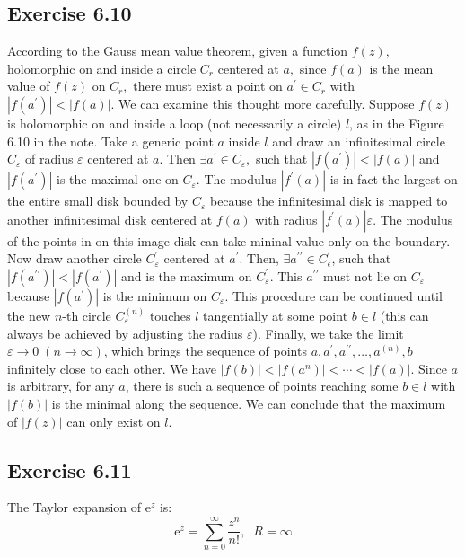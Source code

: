 \documentclass[]{ctexart}
\begin{document}
	\subsection{Exercise 6.10}
	According to the Gauss mean value theorem, given a function $f(z),$ holomorphic on and inside a circle $C_{r}$ centered at $a,$ since $f(a)$ is the mean value of $f(z)$ on $C_{r},$ there must exist a point on $a^{\prime} \in C_{r}$ with $\left|f\left(a^{\prime}\right)\right|<|f(a)| .$ We can examine this thought more carefully. Suppose $f(z)$ is holomorphic on and inside a loop (not necessarily a circle) $l$, as in the Figure 6.10 in the note. Take a generic point $a$ inside $l$ and draw an infinitesimal circle $C_{\varepsilon}$ of radius $\varepsilon$ centered at $a$. Then $\exists a^{\prime} \in C_{\varepsilon},$ such that $\left|f\left(a^{\prime}\right)\right|<|f(a)|$ and $\left|f\left(a^{\prime}\right)\right|$ is the maximal one on $C_{\varepsilon}$. The modulus $\left|f^{\prime}(a)\right|$ is in fact the largest on the entire small disk bounded by $C_{\varepsilon}$ because the infinitesimal disk is mapped to another infinitesimal disk centered at $f(a)$ with radius $\left|f^{\prime}(a)\right| \varepsilon .$ The modulus of the points in on this image disk can take mininal value only on the boundary. Now draw another circle $C_{\varepsilon}^{\prime}$ centered at $a^{\prime}$. Then, $\exists a^{\prime \prime} \in C_{\epsilon}^{\prime}$, such
	that $\left|f\left(a^{\prime \prime}\right)\right|<\left|f\left(a^{\prime}\right)\right|$ and is the maximum on $C_{\varepsilon}^{\prime}$. This $a^{\prime \prime}$ must not lie on $C_{\varepsilon}$ because $\left|f\left(a^{\prime}\right)\right|$ is the minimum on $C_{\varepsilon} .$ This procedure can be continued until the new $n$-th circle $C_{\varepsilon}^{(n)}$ touches $l$ tangentially at some point $b \in l$ (this can always be achieved by adjusting the radius $\varepsilon$). Finally, we take the limit $\varepsilon \rightarrow 0\;(n \rightarrow \infty)$, which brings the sequence of points $a, a^{\prime}, a^{\prime \prime}, \ldots, a^{(n)}, b$ infinitely close to each other. We have $|f(b)|<\left|f\left(a^{n}\right)\right|<\cdots<|f(a)|$. Since $a$ is arbitrary, for any $a$, there is such a sequence of points reaching some $b \in l$ with $|f(b)|$ is the minimal along the sequence. We can conclude that the maximum of $|f(z)|$ can only exist on $l$. 
	\subsection{Exercise 6.11}
	The Taylor expansion of $\mathrm{e}^z$ is:
	\begin{equation*}
	\mathrm{e}^{z}=\sum_{n=0}^\infty\frac{z^n}{n!},\;\;R=\infty
	\end{equation*}
	
\end{document}
